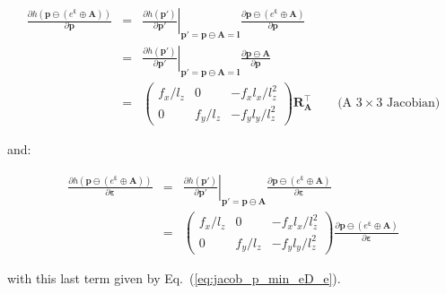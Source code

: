 \documentclass[a4paper,11pt]{report}
\newcommand{\E}{{\bm{\varepsilon}}}
\newcommand{\A}{{\mathbf{A}}}
\begin{document}
\begin{eqnarray}
\frac{\partial h(\mathbf{p} \ominus (e^\E \oplus \A) )}{\partial \mathbf{p}}
&=&
\left. \frac{\partial h(\mathbf{p'})}{\partial \mathbf{p'}} \right|_{ \mathbf{p'} = \mathbf{p} \ominus \A = \mathbf{l} }
\frac{\partial \mathbf{p} \ominus (e^\E \oplus \A) }{\partial \mathbf{p}} \\
&=&
\left. \frac{\partial h(\mathbf{p'})}{\partial \mathbf{p'}} \right|_{ \mathbf{p'} = \mathbf{p} \ominus \A = \mathbf{l} }
\frac{\partial \mathbf{p} \ominus \A }{\partial \mathbf{p}} \\
&=&
\left(
\begin{array}{ccc}
 f_x / l_z   &    0    &  -f_x l_x / l_z^2   \\
 0 & f_y / l_z  &  -f_y l_y / l_z^2
\end{array}
\right)
\mathbf{R_A^\top}
\quad\quad \text{(A $3 \times 3$ Jacobian)}
\end{eqnarray}

\noindent and:

\begin{eqnarray}
\frac{\partial h(\mathbf{p} \ominus (e^\E \oplus \A) )}{\partial \E}
&=&
\left. \frac{\partial h(\mathbf{p'})}{\partial \mathbf{p'}} \right|_{ \mathbf{p'} = \mathbf{p} \ominus \A }
\frac{\partial \mathbf{p} \ominus (e^\E \oplus \A) }{\partial \E} \\
&=&
\left(
\begin{array}{ccc}
 f_x / l_z   &    0    &  -f_x l_x / l_z^2   \\
 0 & f_y / l_z  &  -f_y l_y / l_z^2
\end{array}
\right)
\frac{\partial \mathbf{p} \ominus (e^\E \oplus \A) }{\partial \E}
\end{eqnarray}

\noindent with this last term given by Eq.~(\ref{eq:jacob_p_min_eD_e}).




\end{document}

